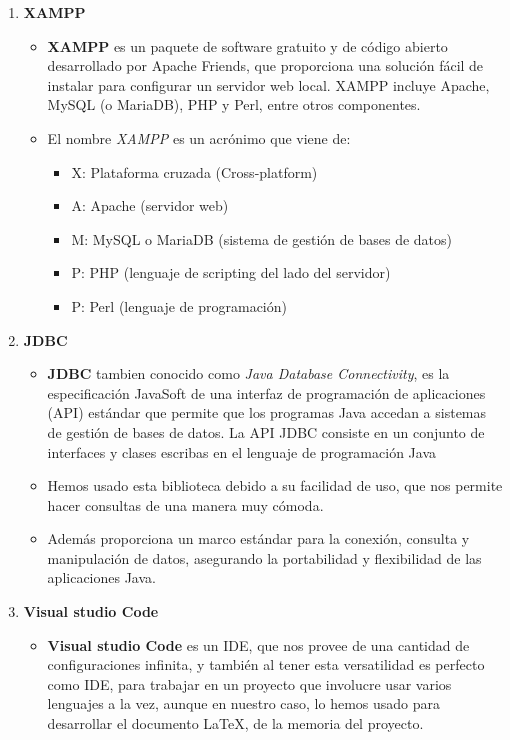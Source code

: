 \documentclass[a4paper]{article}
\begin{document}
\begin{enumerate}
    \item \textbf{XAMPP}
          \begin{itemize}
              \item \textbf{XAMPP} es un paquete de software gratuito y de código abierto desarrollado por Apache Friends, que proporciona una solución fácil de instalar para configurar un servidor web local. XAMPP incluye Apache, MySQL (o MariaDB), PHP y Perl, entre otros componentes.
              \item El nombre \textit{XAMPP} es un acrónimo que viene de:
                    \begin{itemize}
                        \item X: Plataforma cruzada (Cross-platform)
                        \item A: Apache (servidor web)
                        \item M: MySQL o MariaDB (sistema de gestión de bases de datos)
                        \item P: PHP (lenguaje de scripting del lado del servidor)
                        \item P: Perl (lenguaje de programación)
                    \end{itemize}
          \end{itemize}
    \item \textbf{JDBC}
          \begin{itemize}
              \item \textbf{JDBC} tambien conocido como \textit{Java Database Connectivity}, es la especificación JavaSoft de una interfaz de programación de aplicaciones (API) estándar que permite que los programas Java accedan a sistemas de gestión de bases de datos. La API JDBC consiste en un conjunto de interfaces y clases escribas en el lenguaje de programación Java
              \item Hemos usado esta biblioteca debido a su facilidad de uso, que nos permite hacer consultas de una manera muy cómoda.
              \item Además proporciona un marco estándar para la conexión, consulta y manipulación de datos, asegurando la portabilidad y flexibilidad de las aplicaciones Java.
          \end{itemize}
    \item \textbf{Visual studio Code}
          \begin{itemize}
              \item \textbf{Visual studio Code} es un IDE, que nos provee de una cantidad de configuraciones infinita, y también al tener esta versatilidad es perfecto como IDE, para trabajar en un proyecto que involucre usar varios lenguajes a la vez, aunque en nuestro caso, lo hemos usado para desarrollar el documento \LaTeX, de la memoria del proyecto.

\end{itemize}
\end{enumerate}
\end{document}
